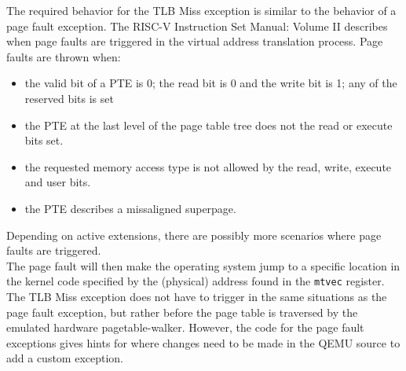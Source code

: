 The required behavior for the TLB Miss exception is similar to the behavior of a page fault exception.
The RISC-V Instruction Set Manual: Volume II \cite{RISCVInstructionSet} describes when page faults
are triggered in the virtual address translation process. Page faults are thrown when:
\begin{itemize}
    \item the valid bit of a PTE is 0; the read bit is 0 and the write bit is 1; any of the reserved
          bits is set
    \item the PTE at the last level of the page table tree does not the read or execute bits set.
    \item the requested memory access type is not allowed by the read, write, execute and user bits.
    \item the PTE describes a missaligned superpage.
\end{itemize}
Depending on active extensions, there are possibly more scenarios where page faults are triggered.\\
The page fault will then make the operating system jump to a specific location in the kernel code
specified by the (physical) address found in the \texttt{mtvec} register.\\
The TLB Miss exception does not have to trigger in the same situations as the page fault exception,
but rather before the page table is traversed by the emulated hardware pagetable-walker.
However, the code for the page fault exceptions gives hints for where changes need to be made in the QEMU
source to add a custom exception.\\ %



